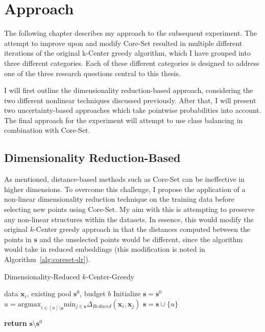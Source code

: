 \documentclass[english,bachelor,ul]{webisthesis} %
\begin{document}
\chapter{Approach}

The following chapter describes my approach to the subsequent experiment. The attempt to improve upon and modify Core-Set resulted in multiple different iterations of the original k-Center greedy algorithm, which I have grouped into three different categories. Each of these different categories is designed to address one of the three research questions central to this thesis. 

I will first outline the dimensionality reduction-based approach, considering the two different nonlinear techniques discussed previously. After that, I will present two uncertainty-based approaches which take pointwise probabilities into account. The final approach for the experiment will attempt to use class balancing in combination with Core-Set.

\section{Dimensionality Reduction-Based}

As mentioned, distance-based methods such as Core-Set can be ineffective in higher dimensions. To overcome this challenge, I propose the application of a non-linear dimensionality reduction technique on the training data before selecting new points using Core-Set. My aim with this is attempting to preserve any non-linear structures within the datasets. In essence, this would modify the original $k$-Center greedy approach in that the distances computed between the points in $ \mathbf{s} $ and the unselected points would be different, since the algorithm would take in reduced embeddings (this modification is noted in Algorithm~\ref{alg:coreset-dr}).

\begin{algorithm}[htpb]
\caption{Dimensionality-Reduced $k$-Center-Greedy}%
\label{alg:coreset-dr}
\begin{algorithmic}


\Require data $ \mathbf{x}_i $, existing pool $ \mathbf{s}^0 $, budget $ b $
\State Initialize $ \mathbf{s} = \mathbf{s}^0 $
\Repeat
\State $ u = \text{argmax}_{i \in [n] \setminus \mathbf{s}} \text{min}_{j \in \mathbf{s}} \Delta_{Reduced}(\mathbf{x}_i, \mathbf{x}_j) $
\State $ \mathbf{s} = \mathbf{s} \cup \{u\} $

\State \textbf{return} $\mathbf{s} \setminus \mathbf{s}^0 $
\end{algorithmic}
\end{algorithm}
\end{document}
